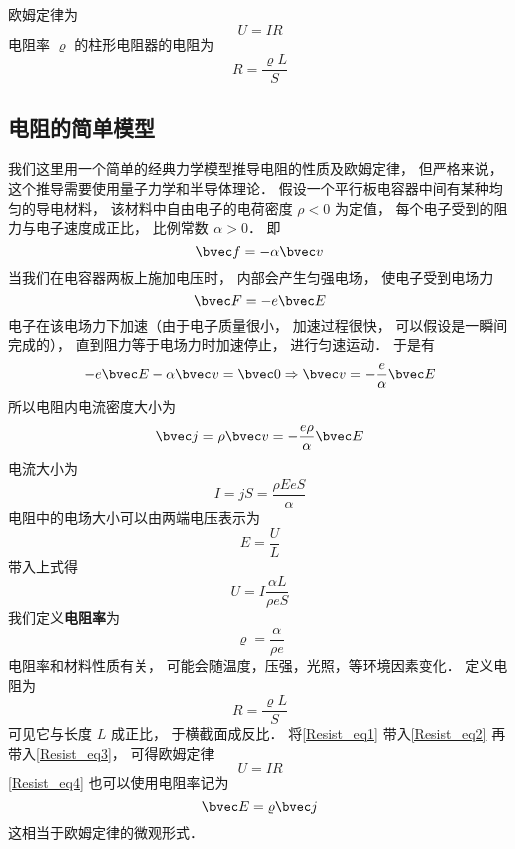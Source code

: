 

欧姆定律为
\begin{equation}
U = IR
\end{equation}
电阻率 $\varrho$ 的柱形电阻器的电阻为
\begin{equation}
R = \frac{\varrho L}{S}
\end{equation}


\subsection{电阻的简单模型}
我们这里用一个简单的经典力学模型推导电阻的性质及欧姆定律， 但严格来说， 这个推导需要使用量子力学和半导体理论． 假设一个平行板电容器中间有某种均匀的导电材料， 该材料中自由电子的电荷密度 $\rho < 0$ 为定值， 每个电子受到的阻力与电子速度成正比， 比例常数 $\alpha > 0$． 即
\begin{equation}
\bvec f = -\alpha \bvec v
\end{equation}
当我们在电容器两板上施加电压时， 内部会产生匀强电场， 使电子受到电场力
\begin{equation}
\bvec F = -e\bvec E
\end{equation}
电子在该电场力下加速（由于电子质量很小， 加速过程很快， 可以假设是一瞬间完成的）， 直到阻力等于电场力时加速停止， 进行匀速运动． 于是有
\begin{equation}
-e\bvec E - \alpha \bvec v = \bvec 0 \Rightarrow \bvec v = -\frac{e}{\alpha}\bvec E
\end{equation}
所以电阻内电流密度大小为
\begin{equation}\label{Resist_eq4}
\bvec j = \rho \bvec v = -\frac{e\rho}{\alpha}\bvec E
\end{equation}
电流大小为
\begin{equation}
I = jS = \frac{\rho EeS}{\alpha}
\end{equation}
电阻中的电场大小可以由两端电压表示为
\begin{equation}
E = \frac UL
\end{equation}
带入上式得
\begin{equation}\label{Resist_eq3}
U = I \frac{\alpha L}{\rho eS}
\end{equation}
我们定义\textbf{电阻率}为
\begin{equation}\label{Resist_eq1}
\varrho = \frac{\alpha}{\rho e}
\end{equation}
电阻率和材料性质有关， 可能会随温度，压强，光照，等环境因素变化． 定义电阻为
\begin{equation}\label{Resist_eq2}
R = \frac{\varrho L}{S}
\end{equation}
可见它与长度 $L$ 成正比， 于横截面成反比． 将\autoref{Resist_eq1} 带入\autoref{Resist_eq2} 再带入\autoref{Resist_eq3}， 可得欧姆定律
\begin{equation}
U = IR
\end{equation}
\autoref{Resist_eq4} 也可以使用电阻率记为
\begin{equation}
\bvec E = \varrho\bvec j
\end{equation}
这相当于欧姆定律的微观形式．
